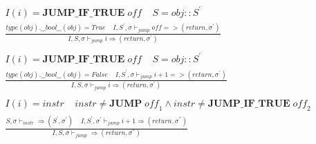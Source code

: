 \documentclass[12pt, a4paper]{report}
\newcommand{\ddfrac}[3]{
    & #1 \\
    & \frac { #2 } { #3 }
}
\newcommand{\gap}{ \;\;\;\; }
\begin{document}
\begin{equation*}
\begin{split}
\ddfrac{
    I(i) = \mathbf{JUMP\_IF\_TRUE} \; \mathit{off}
    \gap
    S = obj :: S^{'}
}{
     type(obj).\_\_bool\_\_(obj) = True
     \gap
    I, S^{'}, \sigma \vdash_{jump} \mathit{off} => (return, \sigma^{'})
}{ I, S, \sigma \vdash_{jump} i \Rightarrow (return, \sigma^{'}) }
\\ \\
\ddfrac{
    I(i) = \mathbf{JUMP\_IF\_TRUE} \; \mathit{off}
    \gap
    S = obj :: S^{'}
}{
    type(obj).\_\_bool\_\_(obj) = False
    \gap
    I, S^{'}, \sigma \vdash_{jump} \mathit{i}+1 => (return, \sigma^{'})
}{ I, S, \sigma \vdash_{jump} i \Rightarrow (return, \sigma^{'})}
\\ \\
\ddfrac{
    I(i) = \mathit{instr}
    \gap
    \mathit{instr} \ne \mathbf{JUMP} \;\mathit{off}_1
        \wedge
    \mathit{instr} \ne \mathbf{JUMP\_IF\_TRUE} \;\mathit{off}_2
}{
    S, \sigma \vdash_{instr} \Rightarrow (S^{'}, \sigma^{'})
    \gap
    I, S^{'}, \sigma^{'} \vdash_{jump} i + 1 \Rightarrow (return, \sigma^{''})
}{
    I, S, \sigma \vdash_{jump} \Rightarrow (return, \sigma^{''})
}
\end{split}
\end{equation*}

% 
\end{document}
